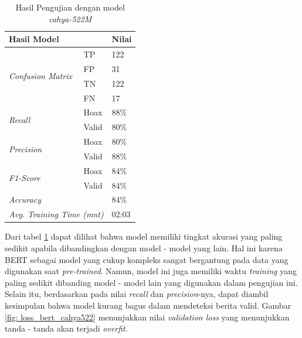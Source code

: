 \begin{table}[h]
    \caption{Hasil Pengujian dengan model \textit{cahya-522M}}
    \label{tab: loss_cahya522}
    \centering
    \begin{tabular}{|l|l|l|}
        \hline
        \multicolumn{2}{|l|}{\textbf{Hasil Model}}              & \textbf{Nilai}        \\ \hline
        \multirow{4}{*}{\textit{Confusion Matrix}}              & TP             & 122  \\ \cline{2-3}
                                                                & FP             & 31   \\ \cline{2-3}
                                                                & TN             & 122  \\ \cline{2-3}
                                                                & FN             & 17   \\ \hline
        \multirow{2}{*}{\textit{Recall}}                        & Hoax           & 88\% \\ \cline{2-3}
                                                                & Valid          & 80\% \\ \hline
        \multirow{2}{*}{\textit{Precision}}                     & Hoax           & 80\% \\ \cline{2-3}
                                                                & Valid          & 88\% \\ \hline
        \multirow{2}{*}{\textit{F1-Score}}                      & Hoax           & 84\% \\ \cline{2-3}
                                                                & Valid          & 84\% \\ \hline
        \multicolumn{2}{|l|}{\textit{Accuracy}}                 & 84\%                  \\ \hline
        \multicolumn{2}{|l|}{\textit{Avg. Training Time (mnt)}} & 02:03                 \\ \hline
    \end{tabular}
\end{table}

Dari tabel \ref{tab: loss_cahya522} dapat dilihat bahwa model memiliki tingkat akurasi yang paling sedikit apabila dibandingkan dengan model - model yang lain. Hal ini karena BERT sebagai model yang cukup kompleks sangat bergantung pada data yang digunakan saat \textit{pre-trained}. Namun, model ini juga memiliki waktu \textit{training} yang paling sedikit dibanding model - model lain yang digunakan dalam pengujian ini. Selain itu, berdasarkan pada nilai \textit{recall} dan \textit{precision}-nya, dapat diambil kesimpulan bahwa model kurang bagus dalam mendeteksi berita valid. Gambar \ref{fig: loss_bert_cahya522} menunjukkan nilai \textit{validation loss} yang menunjukkan tanda - tanda akan terjadi \textit{overfit}.

